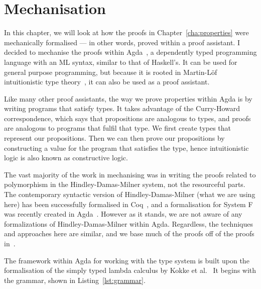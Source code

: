 \chapter{Mechanisation}\label{cha:mechanisation}
In this chapter, we will look at how the proofs in
Chapter~\ref{cha:properties} were mechanically formalised --- in other
words, proved within a proof assistant.  I decided to mechanise the
proofs within Agda~\cite{norell2009}, a dependently typed programming
language with an ML syntax, similar to that of Haskell's. It can be
used for general purpose programming, but because it is rooted in
Martin-Löf intuitionistic type theory~\cite{martin-lof1984}, it can
also be used as a proof assistant.

Like many other proof assistants, the way we prove properties within
Agda is by writing programs that satisfy types. It takes advantage of
the Curry-Howard correspondence, which says that propositions are
analogous to types, and proofs are analogous to programs that fulfil
that type. We first create types that represent our
propositions. Then we can then prove our propositions by constructing
a value for the program that satisfies the type, hence intuitionistic
logic is also known as constructive logic.

The vast majority of the work in mechanising was in writing the proofs
related to polymorphism in the Hindley-Damas-Milner system, not the
resourceful parts. The contemporary syntactic version of
Hindley-Damas-Milner (what we are using here) has been successfully
formalised in Coq~\cite{dubois2000}, and a formalisation for System F
was recently created in Agda~\cite{chapman2019}. However as it stands,
we are not aware of any formalizations of Hindley-Damas-Milner within
Agda. Regardless, the techniques and approaches here are similar, and
we base much of the proofs off of the proofs in~\cite{wright1994}.

The framework within Agda for working with the type system is built
upon the formalisation of the simply typed lambda calculus by Kokke et
al.~\cite{kokke2020} It begins with the grammar, shown in
Listing~\ref{lst:grammar}.


